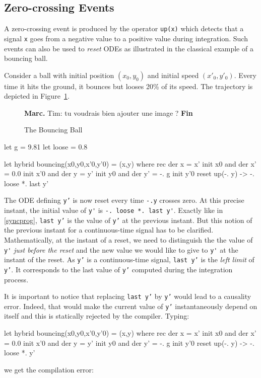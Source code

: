\documentclass[11pt,titlepage,twoside]{report}
\newcommand{\Marc}[1]{{\bf Marc.} {#1} {\bf Fin}}
\begin{document}
\subsection{Zero-crossing Events\label{zerocrossings}} %

A zero-crossing event is produced by the operator \texttt{up(x)}
which detects that a signal \texttt{x} goes from a negative value to a
positive value during integration. Such events can also be used
to \emph{reset} ODEs as illustrated in the classical example of a bouncing 
ball.

Consider a ball with initial position $(x_0, y_0)$ and initial speed
$(x'_0, y'_0)$. Every time it hits the ground, it bounces but looses
20\% of its speed. The trajectory is depicted in 
Figure~\cref{fig:bouncing-ball}.

\begin{figure}
  \Marc{Tim: tu voudrais bien ajouter une image ?}
\caption{The Bouncing Ball~\label{fig:bouncing-ball}}
\end{figure}

\begin{chklisting}[label=gravity]
let g = 9.81
let loose = 0.8
\end{chklisting}
\begin{chklisting}
let hybrid bouncing(x0,y0,x'0,y'0) = (x,y) where
 rec der x = x' init x0
 and der x' = 0.0 init x'0
 and der y = y' init y0
 and der y' = -. g init y'0 reset up(-. y) -> -. loose *. last y'
\end{chklisting}

The ODE defining \texttt{y'} is now reset every time \texttt{-.y}
crosses zero.  At this precise instant, the initial value of \verb-y'-
is \verb+-. loose *. last y'+. Exactly like in
\cref{syncprog}, \texttt{last y'} is the
value of \texttt{y'} at the previous instant. But this notion of the
previous instant for a continuous-time signal has to be
clarified. Mathematically, at the instant of a reset, we need to
distinguish the the value of \verb-y'- \emph{just before the reset}
and the new value we would like to give to \verb-y'- at the instant of
the reset. As \texttt{y'} is a continuous-time signal, \texttt{last
  y'} is the \emph{left limit} of \texttt{y'}. It corresponds to the
last value of \texttt{y'} computed during the integration process.

It is important to notice that replacing \texttt{last y'} by
\texttt{y'} would lead to a causality error. Indeed, that would make
the current value of \texttt{y'} instantaneously depend on itself and
this is statically rejected by the compiler. Typing:
\begin{chklisting}[include=gravity,fail]
let hybrid bouncing(x0,y0,x'0,y'0) = (x,y) where
 rec der x = x' init x0
 and der x' = 0.0 init x'0
 and der y = y' init y0
 and der y' = -. g init y'0 reset up(-. y) -> -. loose *. y'
\end{chklisting}
we get the compilation error:
\chklistingerr{}
\end{document}

